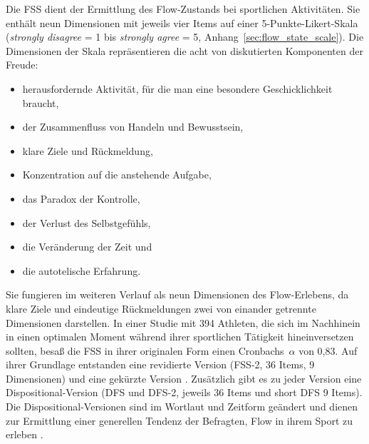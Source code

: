 \label{ssub:flow_state_scale}

Die \ac{FSS} dient der Ermittlung des Flow-Zustands bei sportlichen Aktivitäten. Sie enthält neun Dimensionen mit jeweils vier Items auf einer 5-Punkte-Likert-Skala (\emph{strongly disagree} = 1 bis \emph{strongly agree} = 5, Anhang~\ref{sec:flow_state_scale}). Die Dimensionen der Skala repräsentieren die acht von \citet[S. 73-101]{Csikszentmihalyi1992} diskutierten Komponenten der Freude: 

\begin{itemize}

	\item herausfordernde Aktivität, für die man eine besondere Geschicklichkeit braucht,

	\item der Zusammenfluss von Handeln und Bewusstsein,

	\item klare Ziele und Rückmeldung,

	\item Konzentration auf die anstehende Aufgabe,

	\item das Paradox der Kontrolle,

	\item der Verlust des Selbstgefühls,

	\item die Veränderung der Zeit und

	\item die autotelische Erfahrung.

\end{itemize}

Sie fungieren im weiteren Verlauf als neun Dimensionen des Flow-Erlebens, da klare Ziele und eindeutige Rückmeldungen zwei von einander getrennte Dimensionen darstellen. In einer Studie mit 394 Athleten, die sich im Nachhinein in einen optimalen Moment während ihrer sportlichen Tätigkeit hineinversetzen sollten, besaß die \ac{FSS} in ihrer originalen Form einen Cronbachs~$\alpha$ von 0,83. Auf ihrer Grundlage entstanden eine revidierte Version (\ac{FSS}-2, 36 Items, 9 Dimensionen) und eine gekürzte Version \citep[short \ac{FSS}-2, 9 Items,][]{Jackson2002, Jackson2008}. Zusätzlich gibt es zu jeder Version eine Dispositional-Version (\acs{DFS} und \acs{DFS}-2, jeweils 36 Items und short \acs{DFS} 9 Items). Die Dispositional-Versionen sind im Wortlaut und Zeitform geändert und dienen zur Ermittlung einer generellen Tendenz der Befragten, Flow in ihrem Sport zu erleben \citep[][S.~356]{Jackson1998}.

